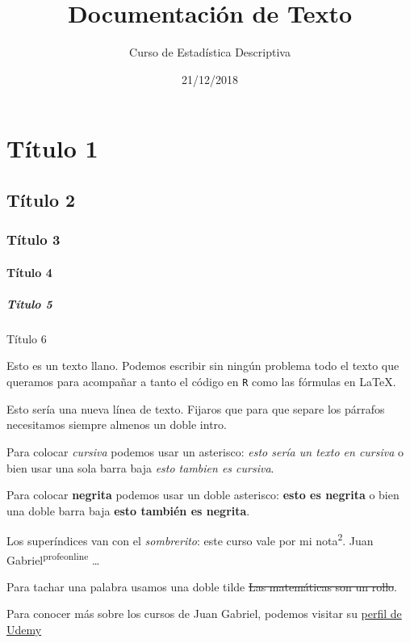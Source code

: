 \documentclass[
]{article}
\title{Documentación de Texto}
\author{Curso de Estadística Descriptiva}
\date{21/12/2018}
\begin{document}
\maketitle

\hypertarget{tuxedtulo-1}{%
\section{Título 1}\label{tuxedtulo-1}}

\hypertarget{tuxedtulo-2}{%
\subsection{Título 2}\label{tuxedtulo-2}}

\hypertarget{tuxedtulo-3}{%
\subsubsection{Título 3}\label{tuxedtulo-3}}

\hypertarget{tuxedtulo-4}{%
\paragraph{Título 4}\label{tuxedtulo-4}}

\hypertarget{tuxedtulo-5}{%
\subparagraph{Título 5}\label{tuxedtulo-5}}

Título 6

Esto es un texto llano. Podemos escribir sin ningún problema todo el
texto que queramos para acompañar a tanto el código en \texttt{R} como
las fórmulas en \LaTeX.

Esto sería una nueva línea de texto. Fijaros que para que separe los
párrafos necesitamos siempre almenos un doble intro.

Para colocar \emph{cursiva} podemos usar un asterisco: \emph{esto sería
un texto en cursiva} o bien usar una sola barra baja \emph{esto tambien
es cursiva}.

Para colocar \textbf{negrita} podemos usar un doble asterisco:
\textbf{esto es negrita} o bien una doble barra baja \textbf{esto
también es negrita}.

Los superíndices van con el \emph{sombrerito}: este curso vale por mi
nota\textsuperscript{2}. Juan Gabriel\textsuperscript{profeonline}
\ldots{}

Para tachar una palabra usamos una doble tilde \sout{Las matemáticas son
un rollo}.

Para conocer más sobre los cursos de Juan Gabriel, podemos visitar su
\href{https://udemy.com/u/juangabriel2}{perfil de Udemy}
\end{document}
